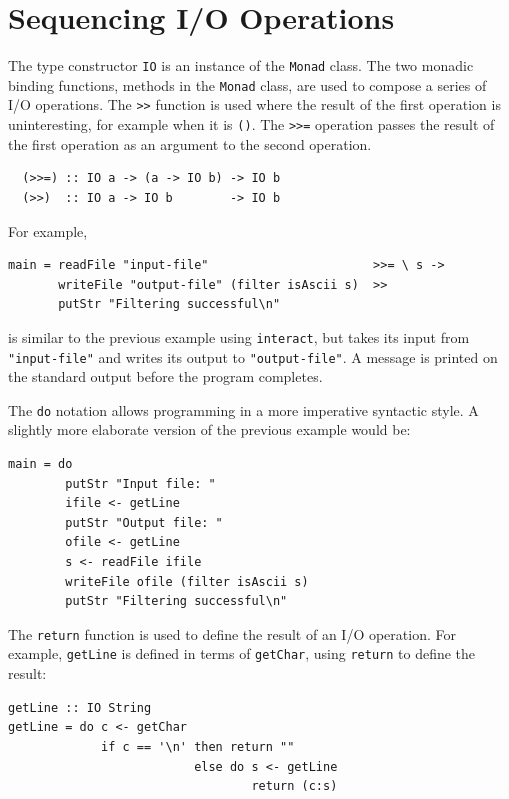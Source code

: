 \section{Sequencing I/O Operations}
\indextt{>>}
\indextt{>>=}
The type constructor \mbox{\tt IO} is an instance of the \mbox{\tt Monad} class.
The two monadic binding functions, methods in the \mbox{\tt Monad} class, are
used to compose a series of I/O
operations.  The \mbox{\tt >>}
function is used where the result of the first operation is
uninteresting, for example when it is \mbox{\tt ()}.  The \mbox{\tt >>=} operation
passes the result of the first operation as an argument to the second
operation.  
\bprog
{\small\begin{verbatim}
  (>>=) :: IO a -> (a -> IO b) -> IO b 
  (>>)  :: IO a -> IO b        -> IO b
\end{verbatim}}
\eprog
For example,
\bprog
{\small\begin{verbatim}
main = readFile "input-file"                       >>= \ s ->
       writeFile "output-file" (filter isAscii s)  >>
       putStr "Filtering successful\n"
\end{verbatim}}
\eprog
is similar to the previous example using \mbox{\tt interact}, but takes its input
from \mbox{\tt "input-file"} and writes its output to \mbox{\tt "output-file"}.  A message
is printed on the standard output before the program completes.

The \mbox{\tt do} notation allows programming in a more imperative syntactic
style.  A slightly more elaborate version of the previous example
would be:
\bprog
{\small\begin{verbatim}
main = do
        putStr "Input file: "
        ifile <- getLine
        putStr "Output file: "
        ofile <- getLine
        s <- readFile ifile
        writeFile ofile (filter isAscii s) 
        putStr "Filtering successful\n"
\end{verbatim}}
\eprog

The \mbox{\tt return} function is used to define the result of an I/O
operation.  For example, \mbox{\tt getLine} is defined in terms of \mbox{\tt getChar},
using \mbox{\tt return} to define the result:
\bprog
{\small\begin{verbatim}
getLine :: IO String
getLine = do c <- getChar
             if c == '\n' then return ""
                          else do s <- getLine
                                  return (c:s)
\end{verbatim}}
\eprog


